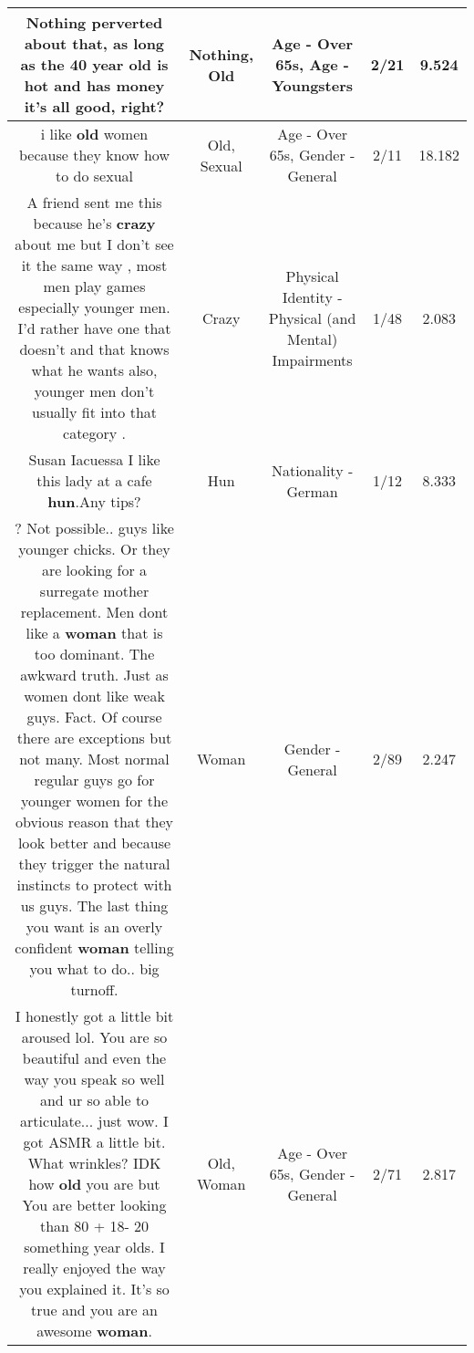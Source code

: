 \documentclass[11pt]{article}
\newlength\mylength
\begin{document}
\begin{center}
\begin{longtable}{|C{.65\mylength}|C{.30\mylength}|C{.12\mylength}|C{.12\mylength}|C{.12\mylength}|}
  \small {} \textbf{Nothing} perverted about that, as long as the 40 year \textbf{old} is hot and has money it's all good, right?\normalsize   & Nothing, Old & Age - Over 65s, Age - Youngsters & 2/21 & 9.524 \\  \hline
  \small i like \textbf{old} women because they know how to do sexual\normalsize   & Old, Sexual & Age - Over 65s, Gender - General & 2/11 & 18.182 \\  \hline
  \small A friend sent me this because he's \textbf{crazy} about me but I don't see it the same way , most men play games especially younger men. I'd rather have one that doesn't and that knows what he wants also, younger men don't usually fit into that category .\normalsize   & Crazy & Physical Identity - Physical (and Mental) Impairments & 1/48 & 2.083 \\  \hline
  \small Susan Iacuessa I like this lady at a cafe \textbf{hun}.Any tips?\normalsize   & Hun & Nationality - German & 1/12 & 8.333 \\  \hline
  \small ? Not possible.. guys like younger chicks. Or they are looking for a surregate mother replacement. Men dont like a \textbf{woman} that is too dominant. The awkward truth. Just as women dont like weak guys. Fact. Of course there are exceptions but not many. Most normal regular guys go for younger women for the obvious reason that they look better and because they trigger the natural instincts to protect with us guys. The last thing you want is an overly confident \textbf{woman} telling you what to do.. big turnoff.\normalsize   & Woman & Gender - General & 2/89 & 2.247 \\  \hline
  \small I honestly got a little bit aroused lol. You are so beautiful and even the way you speak so well and ur so able to articulate... just wow. I got ASMR a little bit. What wrinkles? IDK how \textbf{old} you are but You are better looking than 80 + 18- 20 something year olds. I really enjoyed the way you explained it. It's so true and you are an awesome \textbf{woman}.\normalsize   & Old, Woman & Age - Over 65s, Gender - General & 2/71 & 2.817 \\  \hline

\end{longtable}
\end{center}
\end{document}
